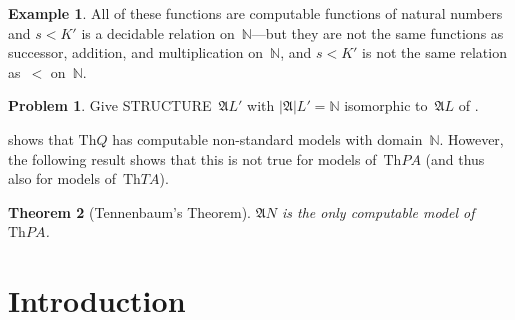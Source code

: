 \documentclass[10pt,a4paper]{article}
\makeatletter
\newcommand*{\olup}[1]{\MakeUppercase{#1}}
\theoremstyle{plain}
\newtheorem{thm}{Theorem}[section]
\theoremstyle{definition}
\newtheorem{ex}[thm]{Example}
\newtheorem{prob}{Problem}[section]
\theoremstyle{remark}
\newenvironment{explain}{}{}
\newcommand*{\olfileid}[3]{}
\newcommand{\olref}{\@ifnextchar[{\olref@i}{\olref@final}}
\def\olref@i[#1]{\@ifnextchar[{\olref@ii}{\olref@final}}
\def\olref@ii[#1]{\@ifnextchar[{\olref@iii}{\olref@final}}
\def\olref@iii[#1]{\olref@final}
\def\olref@final#1{\ref{#1}}
\providecommand{\Struct}{\ensuremath{\mathfrak{A}}}
\providecommand{\Domain}{\ensuremath{|\mathfrak{A}|}}
\providecommand{\Assign}{\ensuremath{s}}
\providecommand{\Th}{\ensuremath{\mathrm{Th}}}
\providecommand{\Nat}{\ensuremath{\mathbb{N}}}
\makeatother
\begin{document}
\begin{ex}
All of these functions are computable functions of natural numbers and
$\Assign{<}{K'}$ is a decidable relation on~$\Nat$---but they are not
the same functions as successor, addition, and multiplication
on~$\Nat$, and $\Assign{<}{K'}$ is not the same relation as~$<$
on~$\Nat$.
\end{ex}

\begin{prob}
Give \olup{structure}~$\Struct{L'}$ with $\Domain{L'} = \Nat$ isomorphic
to~$\Struct{L}$ of \olref[mod][mar][mdq]{ex:model-L-of-Q}.
\end{prob}

\begin{explain}
 shows that $\Th{Q}$ has computable
non-standard models with domain~$\Nat$.  However, the following result
shows that this is not true for models of~$\Th{PA}$ (and thus also for
models of~$\Th{TA}$).
\end{explain}

\begin{thm}[Tennenbaum's Theorem]
$\Struct{N}$ is the only computable model of~$\Th{PA}$.
\end{thm}
  




\olfileid{mod}{mar}{int}
\section{Introduction}
\end{document}
